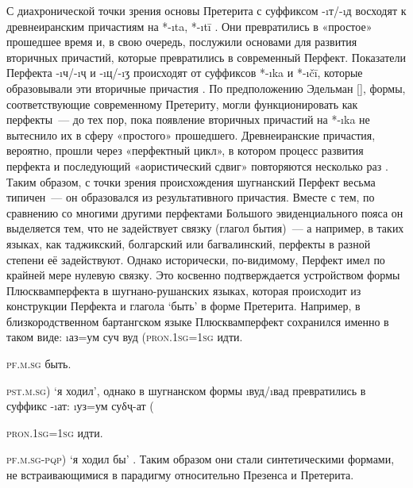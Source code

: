 \pagebreak[4]

С диахронической точки зрения основы Претерита с суффиксом -\i{т}/-\i{д} восходят к древнеиранским причастиям на *-\i{ta}, *-\i{tī} \parencite[77]{dodykhudoeva1988}. Они превратились в «простое» прошедшее время и, в свою очередь, послужили основами для развития вторичных причастий, которые превратились в современный Перфект. Показатели Перфекта -\i{ч}/-\i{ҷ} и -\i{ц}/-\i{ӡ} происходят от суффиксов *-\i{ka} и *-\i{čī}, которые образовывали эти вторичные причастия \parencites[193–203]{pakhalina1989}[290–291]{jugel2020}. По предположению Эдельман [\cite*[358–372]{edelman1975_tense}], формы, соответствующие современному Претериту, могли функционировать как перфекты~— до тех пор, пока появление вторичных причастий на *-\i{ka} не вытеснило их в сферу «простого» прошедшего. Древнеиранские причастия, вероятно, прошли через «перфектный цикл», в котором процесс развития перфекта и последующий «аористический сдвиг» повторяются несколько раз \parencite[24]{plungian2016}. Таким образом, с точки зрения происхождения шугнанский Перфект весьма типичен~— он образовался из результативного причастия. Вместе с тем, по сравнению со многими другими перфектами Большого эвиденциального пояса он выделяется тем, что не задействует связку (глагол бытия)~— а например, в таких языках, как таджикский, болгарский или багвалинский, перфекты в разной степени её задействуют. Однако исторически, по-видимому, Перфект имел по крайней мере нулевую связку. Это косвенно подтверждается устройством формы Плюсквамперфекта в шугнано-рушанских языках, которая происходит из конструкции Перфекта и глагола ‘быть’ в форме Претерита. Например, в близкородственном бартангском языке Плюсквамперфект сохранился именно в таком виде: \i{аз=ум суч вуд} (\textsc{pron.1sg=1sg} идти.{\textsc{pf.m.sg} быть.{\textsc{pst.m.sg}) ‘я ходил’, однако в шугнанском формы \i{вуд}/\i{вад} превратились в суффикс -\i{ат}: \i{уз=ум суδҷ-ат} ({\textsc{pron.1sg=1sg} идти.{\textsc{pf.m.sg-pqp}) ‘я ходил бы’ \parencite[76]{dodykhudoeva1988}. Таким образом они стали синтетическими формами, не встраивающимися в парадигму относительно Презенса и Претерита.

}}}}
